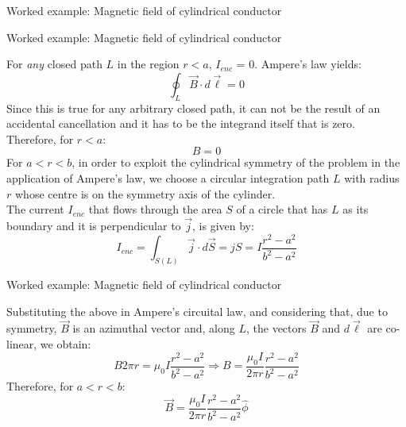{\begin{frame}{Worked example: Magnetic field of cylindrical conductor}
\end{frame}

%
%
%

\begin{frame}{Worked example: Magnetic field of cylindrical conductor}

  For {\em any} closed path $L$ in the region $r<a$,
  $I_{enc}$ = 0. Ampere's law yields:
  \begin{equation*}
     \oint_{L} \vec{B} \cdot d\vec{\ell} = 0
  \end{equation*}
  Since this is true for any arbitrary closed path, it can not be the
  result of an accidental cancellation and it has to be the
  integrand itself that is zero.\\
  Therefore, for $r<a$:
  \begin{equation*}
     B = 0
  \end{equation*}
  For $a<r<b$, in order to exploit the cylindrical symmetry of the problem
  in the application of Ampere's law, we choose a circular integration path $L$
  with radius $r$ whose centre is on the symmetry axis of the cylinder.\\
  The current $I_{enc}$ that flows through the area $S$ of a circle
  that has $L$ as its boundary and it is perpendicular to $\vec{j}$,
  is given by:\\
  \begin{equation*}
     I_{enc} = \int_{S(L)} \vec{j} \cdot d\vec{S} = jS =
       I \frac{r^2-a^2}{b^2-a^2}
  \end{equation*}

\end{frame}

%
%
%

\begin{frame}{Worked example: Magnetic field of cylindrical conductor}

  Substituting the above in Ampere's circuital law,
  and considering that, due to symmetry, $\vec{B}$ is an azimuthal vector
  and, along $L$, the vectors $\vec{B}$ and $d\vec{\ell}$
  are co-linear, we obtain:
  \begin{equation*}
     B 2\pi r = \mu_0 I \frac{r^2-a^2}{b^2-a^2} \Rightarrow
     B = \frac{\mu_0 I}{2\pi r} \frac{r^2-a^2}{b^2-a^2}
  \end{equation*}
  Therefore, for $a<r<b$:
  \begin{equation*}
     \displaystyle
     \vec{B} = \frac{\mu_0 I}{2\pi r} \frac{r^2-a^2}{b^2-a^2} \hat{\phi}
  \end{equation*}


\end{frame}}
